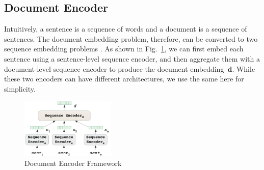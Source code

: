 
\subsection{Document Encoder}
\label{sec_doc_encoder}
Intuitively, a sentence is a sequence of words and a document is a sequence of sentences. %
The document embedding problem, therefore, can be converted to two sequence embedding problems \cite{tang2015document,yang2016hierarchical}. As shown in Fig.~\ref{fig_doc_encoder}, we can first embed each 
sentence using a sentence-level sequence encoder, and then aggregate them with a document-level sequence 
encoder to produce the document embedding~$\mathbf{d}$. 
While these two encoders can have different architectures, we use the same here for simplicity.


\begin{figure}[htbp]
\vspace{-.5em}
\begin{center}
\includegraphics[width=0.4\textwidth]{figures/document_encoder.png}	
\caption{Document Encoder Framework}
\label{fig_doc_encoder}
\end{center}
\end{figure}
%

